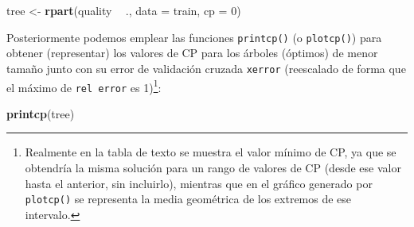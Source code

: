 \documentclass[
  spanish,
]{book}
\newenvironment{Shaded}{\begin{snugshade}}{\end{snugshade}}
\newcommand{\DataTypeTok}[1]{\textcolor[rgb]{0.13,0.29,0.53}{#1}}
\newcommand{\DecValTok}[1]{\textcolor[rgb]{0.00,0.00,0.81}{#1}}
\newcommand{\KeywordTok}[1]{\textcolor[rgb]{0.13,0.29,0.53}{\textbf{#1}}}
\newcommand{\NormalTok}[1]{#1}
\newcommand{\OperatorTok}[1]{\textcolor[rgb]{0.81,0.36,0.00}{\textbf{#1}}}
\newcommand{\StringTok}[1]{\textcolor[rgb]{0.31,0.60,0.02}{#1}}
\theoremstyle{break}
\theoremstyle{definition}
\theoremstyle{definition}
\theoremstyle{definition}
\theoremstyle{remark}
\begin{document}
\begin{Shaded}
\begin{Highlighting}[]
\NormalTok{tree <-}\StringTok{ }\KeywordTok{rpart}\NormalTok{(quality }\OperatorTok{~}\StringTok{ }\NormalTok{., }\DataTypeTok{data =}\NormalTok{ train, }\DataTypeTok{cp =} \DecValTok{0}\NormalTok{)}
\end{Highlighting}
\end{Shaded}

Posteriormente podemos emplear las funciones \texttt{printcp()} (o \texttt{plotcp()}) para obtener (representar)
los valores de CP para los árboles (óptimos) de menor tamaño junto con su error de validación cruzada
\texttt{xerror} (reescalado de forma que el máximo de \texttt{rel\ error} es 1)\footnote{Realmente en la tabla de texto se muestra el valor mínimo de CP, ya que se obtendría la misma solución para un rango de valores de CP (desde ese valor hasta el anterior, sin incluirlo), mientras que en el gráfico generado por \texttt{plotcp()} se representa la media geométrica de los extremos de ese intervalo.}:

\begin{Shaded}
\begin{Highlighting}[]
\KeywordTok{printcp}\NormalTok{(tree)}
\end{Highlighting}
\end{Shaded}
\end{document}
